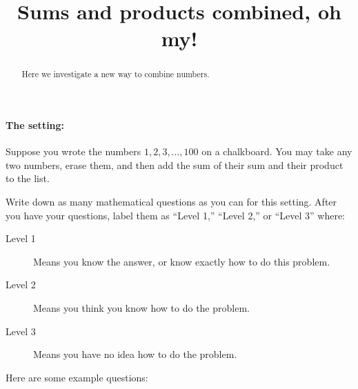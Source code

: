 \documentclass[nooutcomes]{ximera}
\title{Sums and products combined, oh my!}
\begin{document}
\begin{abstract}
Here we investigate a new way to combine numbers.
\end{abstract}
\maketitle

\paragraph{The setting:}

Suppose you wrote the numbers $1,2,3,\dots,100$ on a chalkboard. You
may take any two numbers, erase them, and then add the sum of their
sum and their product to the list.

\begin{problem}
     Write down as many mathematical questions as you can for this
     setting. After you have your questions, label them as ``Level
     1,'' ``Level 2,'' or ``Level 3'' where:
\begin{description}
\item[Level 1] Means you know the answer, or know exactly how to do
  this problem.
\item[Level 2] Means you think you know how to do the problem.
\item[Level 3] Means you have no idea how to do the problem.
\end{description}
\begin{freeResponse}
  Here are some example questions:

\end{freeResponse}
\end{problem}
\end{document}
